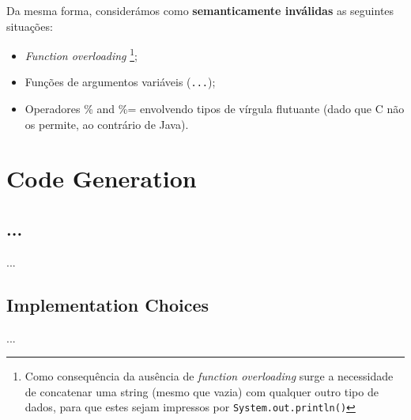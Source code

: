 \documentclass[a4paper]{article}
\begin{document}
Da mesma forma, considerámos como \textbf{semanticamente inválidas} as seguintes situações:
\begin{itemize}
	\item \textit{Function overloading} \footnote[1]{Como consequência da ausência de \textit{function overloading} surge a necessidade de concatenar
		uma string (mesmo que vazia) com qualquer outro tipo de dados, para que estes sejam impressos por \texttt{System.out.println()}};
	\item Funções de argumentos variáveis (\texttt{...});
	\item Operadores \% and \%= envolvendo tipos de vírgula flutuante (dado que C não os permite, ao contrário de Java).
\end{itemize}

\cleardoublepage

\section{Code Generation}
\subsection{...}
\indent \indent ...

\subsection{Implementation Choices}
\indent \indent ...

\cleardoublepage
\end{document}
